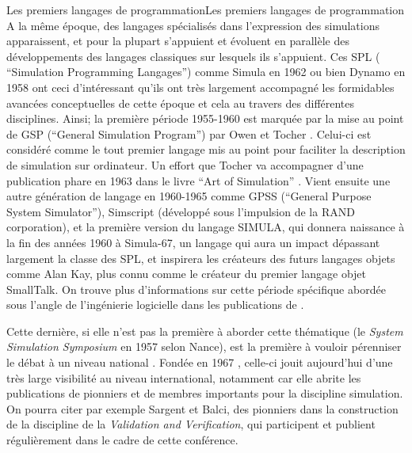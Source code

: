 \begin{testiv}{Les premiers langages de programmation}{Les premiers langages de programmation}
A la même époque, des langages spécialisés dans l'expression des simulations apparaissent, et pour la plupart s'appuient et évoluent en parallèle des développements des langages classiques sur lesquels ils s'appuient. Ces SPL ( \foreignquote{english}{Simulation Programming Langages}) comme Simula en 1962 ou bien Dynamo en 1958 ont ceci d'intéressant qu'ils ont très largement accompagné les formidables avancées conceptuelles de cette époque et cela au travers des différentes disciplines. Ainsi; la première période 1955-1960 est marquée par la mise au point de GSP (\foreignquote{english}{General Simulation Program}) par Owen et Tocher \autocites{Tocher1960, Hollocks2008}. Celui-ci est considéré comme le tout premier langage mis au point pour faciliter la description de simulation sur ordinateur. Un effort que Tocher va accompagner d'une publication phare en 1963 dans le livre \foreignquote{english}{Art of Simulation} \autocite{Tocher1963} . Vient ensuite une autre génération de langage en 1960-1965 comme GPSS (\foreignquote{english}{General Purpose System Simulator}), Simscript (développé sous l'impulsion de la RAND corporation), et la première version du langage SIMULA, qui donnera naissance à la fin des années 1960 à Simula-67, un langage qui aura un impact dépassant largement la classe des SPL, et inspirera les créateurs des futurs langages objets comme Alan Kay, plus connu comme le créateur du premier langage objet SmallTalk. 
On trouve plus d'informations sur cette période spécifique abordée sous l'angle de l'ingénierie logicielle dans les publications de \textcites{Nance2013, Nance1993, Araten1992, Nance2002}.


Cette dernière, si elle n'est pas la première à aborder cette thématique (le \textit{System Simulation Symposium} en 1957 selon Nance), est la première à vouloir pérenniser le débat à un niveau national \autocite{Nance2002}. Fondée en 1967 \autocites{Crain1992, Araten1992}, celle-ci jouit aujourd'hui d'une très large visibilité au niveau international, notamment car elle abrite les publications de pionniers et de membres importants pour la discipline simulation. On pourra citer par exemple Sargent et Balci, des pionniers dans la construction de la discipline de la \textit{Validation and Verification}, qui participent et publient régulièrement dans le cadre de cette conférence.


\end{testiv}

